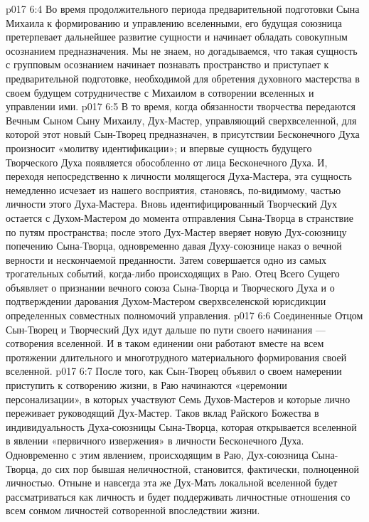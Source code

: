 \vs p017 6:4 \pc {}\bibnobreakspace {} Во время продолжительного периода предварительной подготовки Сына Михаила к формированию и управлению вселенными, его будущая союзница претерпевает дальнейшее развитие сущности и начинает обладать совокупным осознанием предназначения. Мы не знаем, но догадываемся, что такая сущность с групповым осознанием начинает познавать пространство и приступает к предварительной подготовке, необходимой для обретения духовного мастерства в своем будущем сотрудничестве с Михаилом в сотворении вселенных и управлении ими.
\vs p017 6:5 \pc {}\bibnobreakspace {} В то время, когда обязанности творчества передаются Вечным Сыном Сыну Михаилу, Дух\hyp{}Мастер, управляющий сверхвселенной, для которой этот новый Сын\hyp{}Творец предназначен, в присутствии Бесконечного Духа произносит «молитву идентификации»; и впервые сущность будущего Творческого Духа появляется обособленно от лица Бесконечного Духа. И, переходя непосредственно к личности молящегося Духа\hyp{}Мастера, эта сущность немедленно исчезает из нашего восприятия, становясь, по\hyp{}видимому, частью личности этого Духа\hyp{}Мастера. Вновь идентифицированный Творческий Дух остается с Духом\hyp{}Мастером до момента отправления Сына\hyp{}Творца в странствие по путям пространства; после этого Дух\hyp{}Мастер вверяет новую Дух\hyp{}союзницу попечению Сына\hyp{}Творца, одновременно давая Духу\hyp{}союзнице наказ о вечной верности и нескончаемой преданности. Затем совершается одно из самых трогательных событий, когда\hyp{}либо происходящих в Раю. Отец Всего Сущего объявляет о признании вечного союза Сына\hyp{}Творца и Творческого Духа и о подтверждении дарования Духом\hyp{}Мастером сверхвселенской юрисдикции определенных совместных полномочий управления.
\vs p017 6:6 Соединенные Отцом Сын\hyp{}Творец и Творческий Дух идут дальше по пути своего начинания --- сотворения вселенной. И в таком единении они работают вместе на всем протяжении длительного и многотрудного материального формирования своей вселенной.
\vs p017 6:7 \pc {}\bibnobreakspace {} После того, как Сын\hyp{}Творец объявил о своем намерении приступить к сотворению жизни, в Раю начинаются «церемонии персонализации», в которых участвуют Семь Духов\hyp{}Мастеров и которые лично переживает руководящий Дух\hyp{}Мастер. Таков вклад Райского Божества в индивидуальность Духа\hyp{}союзницы Сына\hyp{}Творца, которая открывается вселенной в явлении «первичного извержения» в личности Бесконечного Духа. Одновременно с этим явлением, происходящим в Раю, Дух\hyp{}союзница Сына\hyp{}Творца, до сих пор бывшая неличностной, становится, фактически, полноценной личностью. Отныне и навсегда эта же Дух\hyp{}Мать локальной вселенной будет рассматриваться как личность и будет поддерживать личностные отношения со всем сонмом личностей сотворенной впоследствии жизни.
